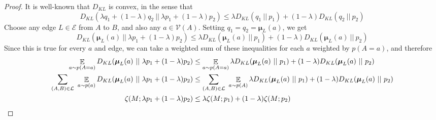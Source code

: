 \documentclass{article}
\newcommand{\bmu}{\boldsymbol{\mu}}
\newcommand{\Ed}{\mathcal E}
\numberwithin{equation}{section}
\begin{document}
	
	\thmzetaconvex*
	\begin{proof}
		It is well-known that $D_{KL}$ is convex, in the sense that 
		\[ D_{KL}(\lambda q_1 + (1-\lambda) q_2 \ ||\ \lambda p_1 + (1-\lambda) p_2) \leq \lambda D_{KL} (q_1\ ||\ p_1) + (1-\lambda) D_{KL}(q_2\ ||\ p_2) \]
		Choose any edge $L \in \Ed$ from $A$ to $B$, and also any $a \in \mathcal V(A)$. 
		Setting $q_1 = q_2 = \bmu_L(a)$, we get
		\[ D_{KL}(\bmu_L(a) \ ||\ \lambda p_1 + (1-\lambda) p_2) \leq \lambda D_{KL} (\bmu_L(a) \ ||\ p_1) + (1-\lambda) D_{KL}(\bmu_L(a)\ ||\ p_2) \]
		Since this is true for every $a$ and edge, we can take a weighted sum of these inequalities for each $a$ weighted by $p(A=a)$, and therefore
		\begin{align*}
			\E_{a\sim p(A=a)} D_{KL}(\bmu_L(a) \ ||\ \lambda p_1 + (1-\lambda) p_2) &\leq \E_{a\sim p(A=a)}\lambda D_{KL} (\bmu_L(a) \ ||\ p_1) + (1-\lambda) D_{KL}(\bmu_L(a)\ ||\ p_2) \\
			\sum_{(A, B) \in \cal L}~\E_{a\sim p(a)} D_{KL}(\bmu_L(a) \ ||\ \lambda p_1 + (1-\lambda) p_2) &\leq \sum_{(A, B) \in \cal L}~\E_{a\sim p(A)}\lambda D_{KL} (\bmu_L(a) \ ||\ p_1) + (1-\lambda) D_{KL}(\bmu_L(a)\ ||\ p_2) \\
			\zeta(M ; \lambda p_1 + (1-\lambda)p_2) &\leq \lambda \zeta(M;p_1) + (1-\lambda) \zeta(M;p_2)
		\end{align*}
	\end{proof}
	
\end{document}
